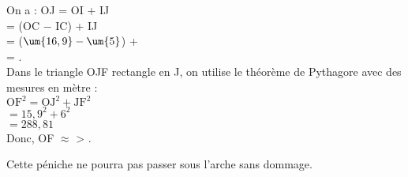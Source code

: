\begin{enumerate}
\begin{minipage}{8cm}
            On a : OJ = OI + IJ \\
            \hspace*{1.35cm} = (OC $-$ IC) + IJ \\
            \hspace*{1.35cm} = ($\um{16,9}-\um{5}$) +  \\
            \hspace*{1.35cm} = . \\ [2mm]
            Dans le triangle OJF rectangle en J, on utilise le théorème de Pythagore avec des mesures en mètre : \\
            $\text{OF}^2 = \text{OJ}^2 + \text{JF}^2$ \\
            \hspace*{0.65cm}  $= 15,9^2 + 6^2$ \\
            \hspace*{0.65cm}  $= 288,81$ \\
            Donc, OF $\approx$  > .
         \end{minipage}
      {\blue Cette péniche ne pourra pas passer sous l'arche sans dommage}.
   \end{enumerate}

